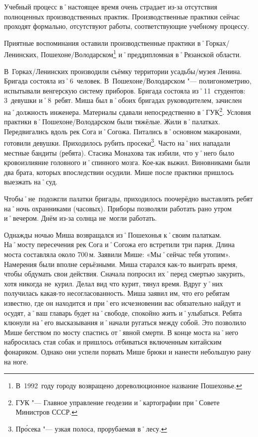 Учебный процесс в˚настоящее время очень страдает из-за отсутствия полноценных производственных практик. Производственные практики сейчас проходят формально, отсутствуют работы, соответствующие учебному процессу. 

Приятные воспоминания оставили производственные практики в˚Горках\-/Ленинских, Пошехоне\-/Володарском\footnote{В~1992~году городу возвращено дореволюционное название Пошехонье.} и˚преддипломная в˚Рязанской области.

В~Горках\-/Ленинских производили съёмку территории усадьбы\-/музея Ленина. Бригада состояла из˚6~человек. В~Пошехоне\-/Володарском "--- полигонометрию, испытывали венгерскую систему приборов. Бригада состояла из˚11~студентов: 3~девушки и˚8~ребят. Миша был в˚обоих бригадах руководителем, зачислен на˚должность инженера. Материалы сдавали непосредственно в˚ГУК\footnote{ГУК "--- Главное управление геодезии и˚картографии при˚Совете Министров СССР.}. Условия практики в˚Пошехоне\-/Володарском были тяжёлые. Жили в˚палатках. Передвигались вдоль рек Сога и˚Согожа. Питались в˚основном макаронами, готовили девушки. Приходилось рубить просеки\footnote{Пр\'{о}сека "--- узкая полоса, прорубаемая в˚лесу.}. Часто на˚них нападали местные бандиты (ребята). Стасика Монахова так избили, что у˚него было кровоизлияние головного и˚спинного мозга. Кое-как выжил. Виновниками были два брата, которых впоследствии осудили. Мише после практики пришлось выезжать на˚суд. 

Чтобы˚не~подожгли палатки бригады, приходилось поочерёдно выставлять ребят на˚ночь охранниками (часовых). Приборы позволяли работать рано утром и˚вечером. Днём из-за солнца не~могли работать. 

Однажды ночью Миша возвращался из˚Пошехонья к˚своим палаткам. На˚мосту пересечения рек Сога и˚Согожа его встретили три парня. Длина моста составляла около 700\,м. Заявили Мише: «Мы˚сейчас тебя утопим». Намерения были вполне серьёзными. Миша старался как-то выиграть время, чтобы обдумать свои действия. Сначала попросил их˚перед смертью закурить, хотя никогда не~курил. Делал вид что курит, тянул время. Вдруг у˚них получилась какая-то несогласованность. Миша заявил им, что его ребятам известно, где он находится и при˚его исчезновении вас обязательно найдут и осудят, а˚ваш главарь будет на˚свободе, спокойно жить и˚улыбаться. Ребята клюнули на˚его высказывания и˚начали ругаться между собой. Это позволило Мише бегством по мосту спастись от˚явной смерти. В конце моста на˚него набросилась стая собак и пришлось отбиваться включенным китайским фонариком. Однако они успели порвать Мише брюки и нанести небольшую рану на ноге.

